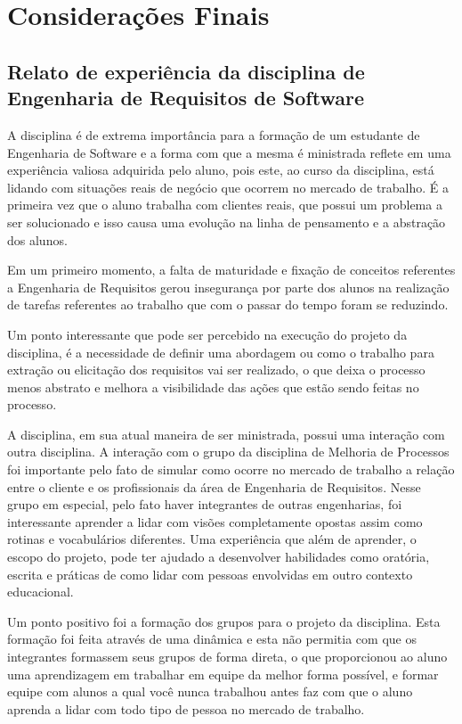 \chapter[Considerações Finais]{Considerações Finais}

\section{Relato de experiência da disciplina de Engenharia de Requisitos de Software}

\indent A disciplina é de extrema importância para a formação de um estudante de Engenharia de Software e a 
forma com que a mesma é ministrada reflete em uma experiência valiosa adquirida pelo aluno, pois este, ao curso 
da disciplina, está lidando com situações reais de negócio que ocorrem no mercado de trabalho. É a primeira vez 
que o aluno trabalha com clientes reais, que possui um problema a ser solucionado e isso causa uma evolução na 
linha de pensamento e a abstração dos alunos.

\indent Em um primeiro momento, a falta de maturidade e fixação de conceitos referentes a Engenharia de Requisitos 
gerou insegurança por parte dos alunos na realização de tarefas referentes ao trabalho que com o passar do tempo 
foram se reduzindo.

\indent Um ponto interessante que pode ser percebido na execução do projeto da disciplina, é a necessidade de definir 
uma abordagem ou como o trabalho para extração ou elicitação dos requisitos vai ser realizado, o que deixa o processo 
menos abstrato e melhora a visibilidade das ações que estão sendo feitas no processo.

\indent A disciplina, em sua atual maneira de ser ministrada, possui uma interação com outra disciplina. A interação 
com o grupo da disciplina de Melhoria de Processos foi importante pelo fato de simular como ocorre no mercado de 
trabalho a relação entre o cliente e os profissionais da área de Engenharia de Requisitos. Nesse grupo em especial, 
pelo fato haver integrantes de outras engenharias, foi interessante aprender a lidar com visões completamente opostas 
assim como rotinas e vocabulários diferentes. Uma experiência que além de aprender, o escopo do projeto, pode ter ajudado 
a desenvolver habilidades como oratória, escrita e práticas de como lidar com pessoas envolvidas em outro contexto 
educacional.

\indent Um ponto positivo foi a formação dos grupos para o projeto da disciplina. Esta formação foi feita através de uma 
dinâmica e esta não permitia com que os integrantes formassem seus grupos de forma direta, o que proporcionou ao aluno uma 
aprendizagem em trabalhar em equipe da melhor forma possível, e formar equipe com alunos a qual você nunca trabalhou antes 
faz com que o aluno aprenda a lidar com todo tipo de pessoa no mercado de trabalho.


